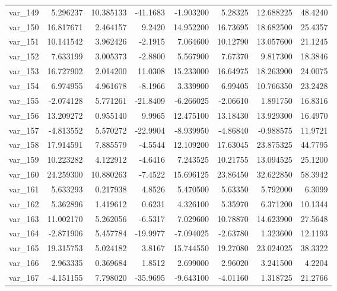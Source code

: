 \documentclass[12pt]{article}
\begin{document}
\begin{longtable}{lrrrrrrr}
 var\_149 &   5.296237 &  10.385133 & -41.1683 &  -1.903200 &   5.28325 &  12.688225 &  48.4240 \\
 var\_150 &  16.817671 &   2.464157 &   9.2420 &  14.952200 &  16.73695 &  18.682500 &  25.4357 \\
 var\_151 &  10.141542 &   3.962426 &  -2.1915 &   7.064600 &  10.12790 &  13.057600 &  21.1245 \\
 var\_152 &   7.633199 &   3.005373 &  -2.8800 &   5.567900 &   7.67370 &   9.817300 &  18.3846 \\
 var\_153 &  16.727902 &   2.014200 &  11.0308 &  15.233000 &  16.64975 &  18.263900 &  24.0075 \\
 var\_154 &   6.974955 &   4.961678 &  -8.1966 &   3.339900 &   6.99405 &  10.766350 &  23.2428 \\
 var\_155 &  -2.074128 &   5.771261 & -21.8409 &  -6.266025 &  -2.06610 &   1.891750 &  16.8316 \\
 var\_156 &  13.209272 &   0.955140 &   9.9965 &  12.475100 &  13.18430 &  13.929300 &  16.4970 \\
 var\_157 &  -4.813552 &   5.570272 & -22.9904 &  -8.939950 &  -4.86840 &  -0.988575 &  11.9721 \\
 var\_158 &  17.914591 &   7.885579 &  -4.5544 &  12.109200 &  17.63045 &  23.875325 &  44.7795 \\
 var\_159 &  10.223282 &   4.122912 &  -4.6416 &   7.243525 &  10.21755 &  13.094525 &  25.1200 \\
 var\_160 &  24.259300 &  10.880263 &  -7.4522 &  15.696125 &  23.86450 &  32.622850 &  58.3942 \\
 var\_161 &   5.633293 &   0.217938 &   4.8526 &   5.470500 &   5.63350 &   5.792000 &   6.3099 \\
 var\_162 &   5.362896 &   1.419612 &   0.6231 &   4.326100 &   5.35970 &   6.371200 &  10.1344 \\
 var\_163 &  11.002170 &   5.262056 &  -6.5317 &   7.029600 &  10.78870 &  14.623900 &  27.5648 \\
 var\_164 &  -2.871906 &   5.457784 & -19.9977 &  -7.094025 &  -2.63780 &   1.323600 &  12.1193 \\
 var\_165 &  19.315753 &   5.024182 &   3.8167 &  15.744550 &  19.27080 &  23.024025 &  38.3322 \\
 var\_166 &   2.963335 &   0.369684 &   1.8512 &   2.699000 &   2.96020 &   3.241500 &   4.2204 \\
 var\_167 &  -4.151155 &   7.798020 & -35.9695 &  -9.643100 &  -4.01160 &   1.318725 &  21.2766 \\

\end{longtable}
\end{document}
